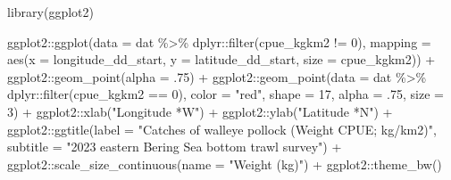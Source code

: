 \documentclass[
  letterpaper,
  oneside,
  open=any]{scrbook}
\newenvironment{Shaded}{\begin{snugshade}}{\end{snugshade}}
\newcommand{\AttributeTok}[1]{\textcolor[rgb]{0.40,0.45,0.13}{#1}}
\newcommand{\DecValTok}[1]{\textcolor[rgb]{0.68,0.00,0.00}{#1}}
\newcommand{\FunctionTok}[1]{\textcolor[rgb]{0.28,0.35,0.67}{#1}}
\newcommand{\NormalTok}[1]{\textcolor[rgb]{0.00,0.23,0.31}{#1}}
\newcommand{\SpecialCharTok}[1]{\textcolor[rgb]{0.37,0.37,0.37}{#1}}
\newcommand{\StringTok}[1]{\textcolor[rgb]{0.13,0.47,0.30}{#1}}
\begin{document}
\begin{Shaded}
\begin{Highlighting}[]
\FunctionTok{library}\NormalTok{(ggplot2)}

\NormalTok{ggplot2}\SpecialCharTok{::}\FunctionTok{ggplot}\NormalTok{(}\AttributeTok{data =}\NormalTok{ dat }\SpecialCharTok{\%\textgreater{}\%}\NormalTok{ dplyr}\SpecialCharTok{::}\FunctionTok{filter}\NormalTok{(cpue\_kgkm2 }\SpecialCharTok{!=} \DecValTok{0}\NormalTok{), }
                \AttributeTok{mapping =} \FunctionTok{aes}\NormalTok{(}\AttributeTok{x =}\NormalTok{ longitude\_dd\_start, }
                              \AttributeTok{y =}\NormalTok{ latitude\_dd\_start, }
                              \AttributeTok{size =}\NormalTok{ cpue\_kgkm2)) }\SpecialCharTok{+} 
\NormalTok{  ggplot2}\SpecialCharTok{::}\FunctionTok{geom\_point}\NormalTok{(}\AttributeTok{alpha =}\NormalTok{ .}\DecValTok{75}\NormalTok{) }\SpecialCharTok{+}
\NormalTok{  ggplot2}\SpecialCharTok{::}\FunctionTok{geom\_point}\NormalTok{(}\AttributeTok{data =}\NormalTok{ dat }\SpecialCharTok{\%\textgreater{}\%}\NormalTok{ dplyr}\SpecialCharTok{::}\FunctionTok{filter}\NormalTok{(cpue\_kgkm2 }\SpecialCharTok{==} \DecValTok{0}\NormalTok{), }
                      \AttributeTok{color =} \StringTok{"red"}\NormalTok{, }
                      \AttributeTok{shape =} \DecValTok{17}\NormalTok{,}
                      \AttributeTok{alpha =}\NormalTok{ .}\DecValTok{75}\NormalTok{,}
                      \AttributeTok{size =} \DecValTok{3}\NormalTok{) }\SpecialCharTok{+}
\NormalTok{  ggplot2}\SpecialCharTok{::}\FunctionTok{xlab}\NormalTok{(}\StringTok{"Longitude *W"}\NormalTok{) }\SpecialCharTok{+}
\NormalTok{  ggplot2}\SpecialCharTok{::}\FunctionTok{ylab}\NormalTok{(}\StringTok{"Latitude *N"}\NormalTok{) }\SpecialCharTok{+}
\NormalTok{  ggplot2}\SpecialCharTok{::}\FunctionTok{ggtitle}\NormalTok{(}\AttributeTok{label =} \StringTok{"Catches of walleye pollock (Weight CPUE; kg/km2)"}\NormalTok{, }
                   \AttributeTok{subtitle =} \StringTok{"2023 eastern Bering Sea bottom trawl survey"}\NormalTok{) }\SpecialCharTok{+}
\NormalTok{  ggplot2}\SpecialCharTok{::}\FunctionTok{scale\_size\_continuous}\NormalTok{(}\AttributeTok{name =} \StringTok{"Weight (kg)"}\NormalTok{) }\SpecialCharTok{+} 
\NormalTok{  ggplot2}\SpecialCharTok{::}\FunctionTok{theme\_bw}\NormalTok{()}
\end{Highlighting}
\end{Shaded}
\end{document}
